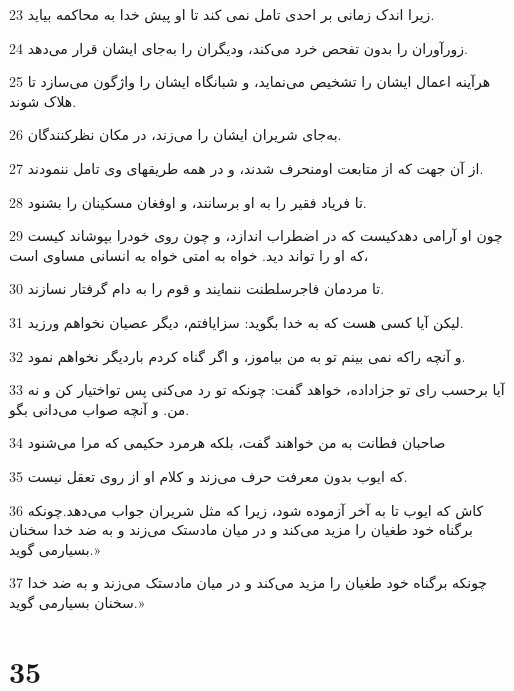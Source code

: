 \par 23 زیرا اندک زمانی بر احدی تامل نمی کند تا او پیش خدا به محاکمه بیاید.
\par 24 زورآوران را بدون تفحص خرد می‌کند، ودیگران را به‌جای ایشان قرار می‌دهد.
\par 25 هرآینه اعمال ایشان را تشخیص می‌نماید، و شبانگاه ایشان را واژگون می‌سازد تا هلاک شوند.
\par 26 به‌جای شریران ایشان را می‌زند، در مکان نظرکنندگان.
\par 27 از آن جهت که از متابعت اومنحرف شدند، و در همه طریقهای وی تامل ننمودند.
\par 28 تا فریاد فقیر را به او برسانند، و اوفغان مسکینان را بشنود.
\par 29 چون او آرامی دهدکیست که در اضطراب اندازد، و چون روی خودرا بپوشاند کیست که او را تواند دید. خواه به امتی خواه به انسانی مساوی است،
\par 30 تا مردمان فاجرسلطنت ننمایند و قوم را به دام گرفتار نسازند.
\par 31 لیکن آیا کسی هست که به خدا بگوید: سزایافتم، دیگر عصیان نخواهم ورزید.
\par 32 و آنچه راکه نمی بینم تو به من بیاموز، و اگر گناه کردم باردیگر نخواهم نمود.
\par 33 آیا برحسب رای تو جزاداده، خواهد گفت: چونکه تو رد می‌کنی پس تواختیار کن و نه من. و آنچه صواب می‌دانی بگو.
\par 34 صاحبان فطانت به من خواهند گفت، بلکه هرمرد حکیمی که مرا می‌شنود
\par 35 که ایوب بدون معرفت حرف می‌زند و کلام او از روی تعقل نیست.
\par 36 کاش که ایوب تا به آخر آزموده شود، زیرا که مثل شریران جواب می‌دهد.چونکه برگناه خود طغیان را مزید می‌کند و در میان مادستک می‌زند و به ضد خدا سخنان بسیارمی گوید.»
\par 37 چونکه برگناه خود طغیان را مزید می‌کند و در میان مادستک می‌زند و به ضد خدا سخنان بسیارمی گوید.»

\chapter{35}

